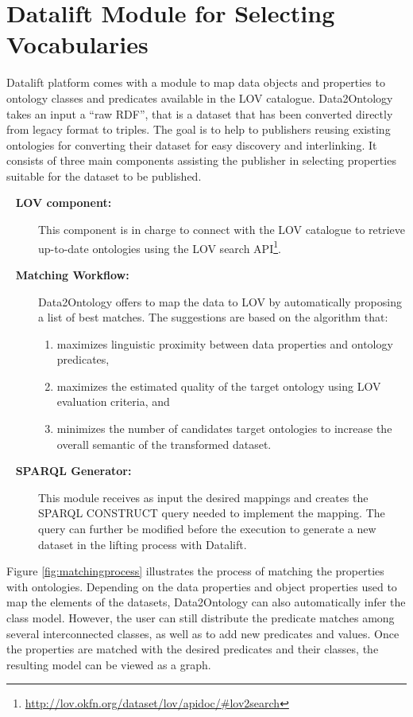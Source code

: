 \section{Datalift Module for Selecting Vocabularies}
\label{sec:data2rdf}
Datalift platform comes with a module to map data objects and properties to ontology classes and predicates available in the LOV catalogue. Data2Ontology takes an input a ``raw RDF'', that is a dataset that has been converted directly from legacy format to triples. The goal is to help to publishers reusing existing ontologies for converting their dataset for easy discovery and interlinking. It consists of three main components assisting the publisher in selecting properties suitable for the dataset to be published. \begin{description}
\item[\odot~ \textbf{LOV component:}] This component is in charge to connect with the LOV catalogue to retrieve up-to-date ontologies using the LOV search API\footnote{\url{http://lov.okfn.org/dataset/lov/apidoc/\#lov2search}}. 
\item[\odot~ \textbf{Matching Workflow:}] Data2Ontology offers to map the data to LOV by automatically proposing a list of best matches. The suggestions are based on the algorithm that:
   \begin{enumerate}
   \item maximizes linguistic proximity between data properties and ontology predicates,
   \item maximizes the estimated quality of the target ontology using LOV evaluation criteria, and
   \item minimizes the number of candidates target ontologies to increase the overall semantic of the transformed dataset.
   \end{enumerate}
   
 \item[\odot~ \textbf{SPARQL Generator:}] This module receives as input the desired mappings and creates the SPARQL CONSTRUCT query needed to implement the mapping. The query can further be modified before the execution to generate a new dataset in the lifting process with Datalift.
   
\end{description}
Figure \ref{fig:matchingprocess} illustrates the process of matching the properties with ontologies. Depending on the data properties and object properties used to map the elements of the datasets, Data2Ontology can also automatically infer the class model. However, the user can still distribute the predicate matches among several interconnected classes, as well as to add new predicates and values. Once the properties are matched with the desired predicates and their classes, the resulting model can be viewed as a graph.  
 
